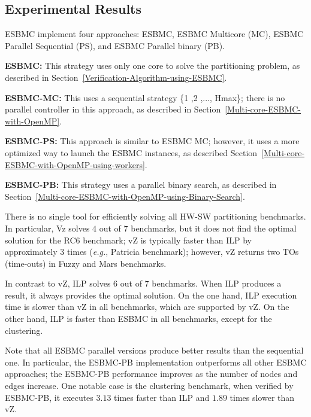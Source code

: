 \subsection{Experimental Results}
\label{Experimental-Results}

ESBMC implement four approaches: ESBMC, ESBMC Multicore (MC), ESBMC Parallel Sequential (PS), and ESBMC Parallel binary (PB).

\begin{itemize}
\item{\textbf{ESBMC:} This strategy uses only one core to solve the partitioning problem, as described in Section~\ref{Verification-Algorithm-using-ESBMC}.
\item{\textbf{ESBMC-MC:} This uses a sequential strategy \{1 ,2 ,\:...\:, Hmax\}; there is no parallel controller in this approach, as described in Section~\ref{Multi-core-ESBMC-with-OpenMP}.}
\item{\textbf{ESBMC-PS:} This approach is similar to ESBMC MC; however, it uses a more optimized way to launch the ESBMC instances, as described Section~\ref{Multi-core-ESBMC-with-OpenMP-using-workers}.}
\item{\textbf{ESBMC-PB:} This strategy uses a parallel binary search, as described in Section~\ref{Multi-core-ESBMC-with-OpenMP-using-Binary-Search}.}}
\end{itemize}

There is no single tool for efficiently solving all HW-SW partitioning benchmarks. In particular, Vz solves $4$ out of $7$ benchmarks, but it does not find the optimal solution for the RC$6$ benchmark; vZ is typically faster than ILP by approximately $3$ times ({\it e.g.}, Patricia benchmark); however, vZ returns two TOs (time-outs) in Fuzzy and Mars benchmarks.

In contrast to vZ, ILP solves $6$ out of $7$ benchmarks. When ILP produces a result, it always provides the optimal solution. On the one hand, ILP execution time is slower than vZ in all benchmarks, which are supported by vZ. On the other hand, ILP is faster than ESBMC in all benchmarks, except for the clustering.

Note that all ESBMC parallel versions produce better results than the sequential one. In particular, the ESBMC-PB implementation outperforms all other ESBMC approaches; the ESBMC-PB performance improves as the number of nodes and edges increase. One notable case is the clustering benchmark, when verified by ESBMC-PB, it executes $3$.$13$ times faster than ILP and $1$.$89$ times slower than vZ.

